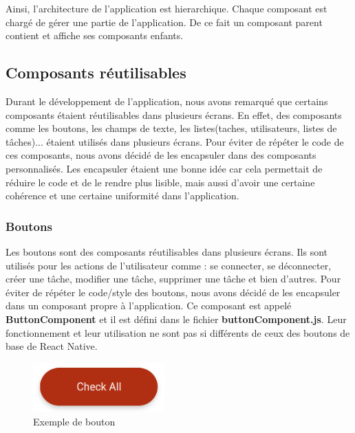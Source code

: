 \documentclass[12pt]{article}
\begin{document}
        Ainsi, l'architecture de l'application est hierarchique. Chaque composant est chargé de gérer une partie de l'application. De
        ce fait un composant parent contient et affiche ses composants enfants.\\

        \subsection{Composants réutilisables}\label{subsec:composants-reutilisables}
        Durant le développement de l'application, nous avons remarqué que certains composants étaient réutilisables dans plusieurs
        écrans. En effet, des composants comme les boutons, les champs de texte, les listes(taches, utilisateurs, listes de tâches)...
        étaient utilisés dans plusieurs écrans. Pour éviter de répéter le code de ces composants, nous avons décidé de les
        encapsuler dans des composants personnalisés. Les encapsuler étaient une bonne idée car cela permettait de réduire le code
        et de le rendre plus lisible, mais aussi d'avoir une certaine cohérence et une certaine uniformité dans l'application.

        \subsubsection{Boutons}\label{subsubsec:boutons}
        Les boutons sont des composants réutilisables dans plusieurs écrans. Ils sont utilisés pour les actions de l'utilisateur
        comme : se connecter, se déconnecter, créer une tâche, modifier une tâche, supprimer une tâche et bien d'autres.
        Pour éviter de répéter le code/style des boutons, nous avons décidé de les encapsuler dans un composant propre à l'application.
        Ce composant est appelé \textbf{ButtonComponent} et il est défini dans le fichier \textbf{buttonComponent.js}.  Leur
        fonctionnement et leur utilisation ne sont pas si différents de ceux des boutons de base de React Native.\\
        \begin{figure}[H]
            \centering
            \includegraphics[width=0.45\textwidth]{images/button}
            \caption{Exemple de bouton}
            \label{fig:button}
        \end{figure}
\end{document}
